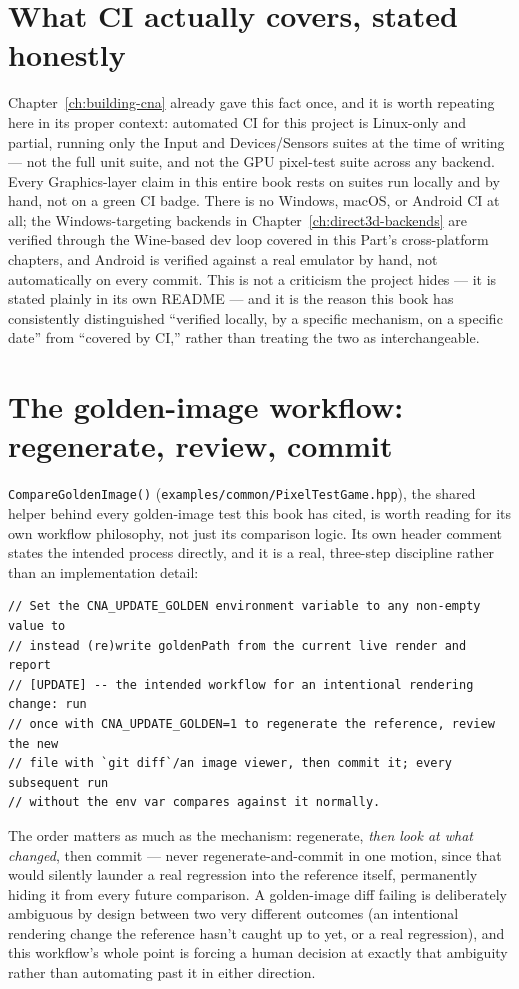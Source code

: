 \section{What CI actually covers, stated honestly}

Chapter~\ref{ch:building-cna} already gave this fact once, and it is worth
repeating here in its proper context: automated CI for this project is Linux-only and
partial, running only the Input and Devices/Sensors suites at the time of writing --- not the
full unit suite, and not the GPU pixel-test suite across any backend. Every Graphics-layer
claim in this entire book rests on suites run locally and by hand, not on a green CI badge.
There is no Windows, macOS, or Android CI at all; the Windows-targeting backends in
Chapter~\ref{ch:direct3d-backends} are verified through the Wine-based dev loop covered in
this Part's cross-platform chapters, and Android is verified against a real emulator by hand,
not automatically on every commit. This is not a criticism the project hides --- it is stated
plainly in its own README --- and it is the reason this book has consistently distinguished
``verified locally, by a specific mechanism, on a specific date'' from ``covered by CI,''
rather than treating the two as interchangeable.

\section{The golden-image workflow: regenerate, review, commit}

\texttt{CompareGoldenImage()} (\texttt{examples/common/PixelTestGame.hpp}), the shared helper
behind every golden-image test this book has cited, is worth reading for its own workflow
philosophy, not just its comparison logic. Its own header comment states the intended process
directly, and it is a real, three-step discipline rather than an implementation detail:

\begin{lstlisting}
// Set the CNA_UPDATE_GOLDEN environment variable to any non-empty value to
// instead (re)write goldenPath from the current live render and report
// [UPDATE] -- the intended workflow for an intentional rendering change: run
// once with CNA_UPDATE_GOLDEN=1 to regenerate the reference, review the new
// file with `git diff`/an image viewer, then commit it; every subsequent run
// without the env var compares against it normally.
\end{lstlisting}

The order matters as much as the mechanism: regenerate, \emph{then look at what changed}, then
commit --- never regenerate-and-commit in one motion, since that would silently launder a real
regression into the reference itself, permanently hiding it from every future comparison. A
golden-image diff failing is deliberately ambiguous by design between two very different
outcomes (an intentional rendering change the reference hasn't caught up to yet, or a real
regression), and this workflow's whole point is forcing a human decision at exactly that
ambiguity rather than automating past it in either direction.

